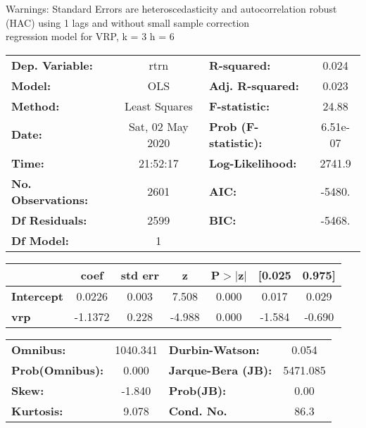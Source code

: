 Warnings: \newline
 [1] Standard Errors are heteroscedasticity and autocorrelation robust (HAC) using 1 lags and without small sample correction\\ 

regression model for VRP, k = 3 h = 6\begin{center}
\begin{tabular}{lclc}
\toprule
\textbf{Dep. Variable:}    &       rtrn       & \textbf{  R-squared:         } &     0.024   \\
\textbf{Model:}            &       OLS        & \textbf{  Adj. R-squared:    } &     0.023   \\
\textbf{Method:}           &  Least Squares   & \textbf{  F-statistic:       } &     24.88   \\
\textbf{Date:}             & Sat, 02 May 2020 & \textbf{  Prob (F-statistic):} &  6.51e-07   \\
\textbf{Time:}             &     21:52:17     & \textbf{  Log-Likelihood:    } &    2741.9   \\
\textbf{No. Observations:} &        2601      & \textbf{  AIC:               } &    -5480.   \\
\textbf{Df Residuals:}     &        2599      & \textbf{  BIC:               } &    -5468.   \\
\textbf{Df Model:}         &           1      & \textbf{                     } &             \\
\bottomrule
\end{tabular}
\begin{tabular}{lcccccc}
                   & \textbf{coef} & \textbf{std err} & \textbf{z} & \textbf{P$> |$z$|$} & \textbf{[0.025} & \textbf{0.975]}  \\
\midrule
\textbf{Intercept} &       0.0226  &        0.003     &     7.508  &         0.000        &        0.017    &        0.029     \\
\textbf{vrp}       &      -1.1372  &        0.228     &    -4.988  &         0.000        &       -1.584    &       -0.690     \\
\bottomrule
\end{tabular}
\begin{tabular}{lclc}
\textbf{Omnibus:}       & 1040.341 & \textbf{  Durbin-Watson:     } &    0.054  \\
\textbf{Prob(Omnibus):} &   0.000  & \textbf{  Jarque-Bera (JB):  } & 5471.085  \\
\textbf{Skew:}          &  -1.840  & \textbf{  Prob(JB):          } &     0.00  \\
\textbf{Kurtosis:}      &   9.078  & \textbf{  Cond. No.          } &     86.3  \\
\bottomrule
\end{tabular}
\end{center}

